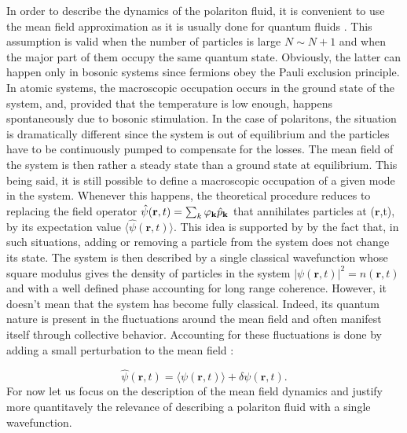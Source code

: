 In order to describe the dynamics of the polariton fluid, it is convenient to use the mean field approximation as it is usually done for quantum fluids \cite{pitaevskij_bose-einstein_2016}. This assumption is valid when the number of particles is large $N \sim N+1$ and when the major part of them occupy the same quantum state.
Obviously, the latter can happen only in bosonic systems since fermions obey the Pauli exclusion principle. In atomic systems, the macroscopic occupation occurs in the ground state of the system, and, provided that the temperature is low enough, happens spontaneously due to bosonic stimulation. In the case of polaritons, the situation is dramatically different since the system is out of equilibrium and the particles have to be continuously pumped to compensate for the losses.
The mean field of the system is then rather a steady state than a ground state at equilibrium. This being said, it is still possible to define a macroscopic occupation of a given mode in the system.
Whenever this happens, the theoretical procedure reduces to replacing the field operator $\hat{\psi}(\mathbf{r},t)= \sum_{k}\varphi_{\mathbf{k}} \hat{p}_{\mathbf{k}}$ that annihilates particles at ($\mathbf{r}$,t), by its expectation value $\langle \hat{\psi}(\mathbf{r},t)\rangle$. This idea is supported by
by the fact that, in such situations, adding or removing a particle from the system does not change its state. The system is then described by a single classical wavefunction whose square modulus gives the density of particles in the system $|\psi(\mathbf{r},t)|^2= n(\mathbf{r},t)$ and with a well defined phase 
accounting for long range coherence. However, it doesn't mean that the system has become fully classical. Indeed, its quantum nature is present in the fluctuations around the mean field and often manifest itself through collective behavior. Accounting for these fluctuations is done 
by adding a small perturbation to the mean field : 

\begin{equation}
    \label{eq:mean_field_and_fluctuation}
    \hat{\psi}(\mathbf{r},t) = \langle \psi(\mathbf{r},t) \rangle + \delta \psi(\mathbf{r},t).
\end{equation}
For now let us focus on the description of the mean field dynamics and justify more quantitavely the relevance of describing a polariton fluid with a single wavefunction.

\bigskip

